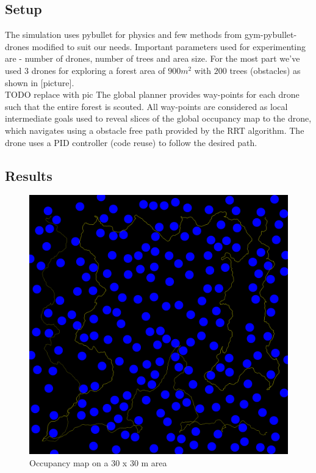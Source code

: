 \subsection{Setup}

The simulation uses pybullet for physics and few methods from gym-pybullet-drones modified to suit our needs. Important parameters used for experimenting are - number of drones, number of trees and area size. For the most part we've used $3$ drones for exploring a forest area of $900m^2$ with $200$ trees (obstacles) as shown in [picture]. \\

TODO replace with pic
The global planner provides way-points for each drone such that the entire forest is scouted. All way-points are considered as local intermediate goals used to reveal slices of the global occupancy map to the drone, which navigates using a obstacle free path provided by the RRT algorithm. The drone uses a PID controller (code reuse) to follow the desired path.\\

\subsection{Results}

\begin{figure}[h]
\centering
\includegraphics[scale=0.08]{images/preview_map_frame_11193.png}
\caption{Occupancy map on a 30 x 30 m area}
\end{figure}


